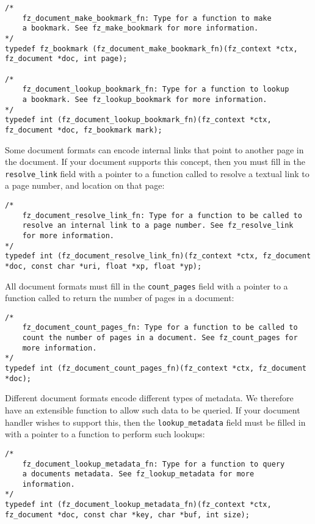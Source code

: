 \documentclass[oneside]{book}
\begin{document}
\begin{lstlisting}
/*
	fz_document_make_bookmark_fn: Type for a function to make
	a bookmark. See fz_make_bookmark for more information.
*/
typedef fz_bookmark (fz_document_make_bookmark_fn)(fz_context *ctx, fz_document *doc, int page);

/*
	fz_document_lookup_bookmark_fn: Type for a function to lookup
	a bookmark. See fz_lookup_bookmark for more information.
*/
typedef int (fz_document_lookup_bookmark_fn)(fz_context *ctx, fz_document *doc, fz_bookmark mark);
\end{lstlisting}

Some document formats can encode internal links that point to another page in the document. If your document supports this concept, then you must fill in the \texttt{resolve\_link} field with a pointer to a function called to resolve a textual link to a page number, and location on that page:

\begin{lstlisting}
/*
	fz_document_resolve_link_fn: Type for a function to be called to
	resolve an internal link to a page number. See fz_resolve_link
	for more information.
*/
typedef int (fz_document_resolve_link_fn)(fz_context *ctx, fz_document *doc, const char *uri, float *xp, float *yp);
\end{lstlisting}

All document formats must fill in the \texttt{count\_pages} field with a pointer to a function called to return the number of pages in a document:

\begin{lstlisting}
/*
	fz_document_count_pages_fn: Type for a function to be called to
	count the number of pages in a document. See fz_count_pages for
	more information.
*/
typedef int (fz_document_count_pages_fn)(fz_context *ctx, fz_document *doc);
\end{lstlisting}

Different document formats encode different types of metadata. We therefore have an extensible function to allow such data to be queried. If your document handler wishes to support this, then the \texttt{lookup\_metadata} field must be filled in with a pointer to a function to perform such lookups:

\begin{lstlisting}
/*
	fz_document_lookup_metadata_fn: Type for a function to query
	a documents metadata. See fz_lookup_metadata for more
	information.
*/
typedef int (fz_document_lookup_metadata_fn)(fz_context *ctx, fz_document *doc, const char *key, char *buf, int size);
\end{lstlisting}
\end{document}
